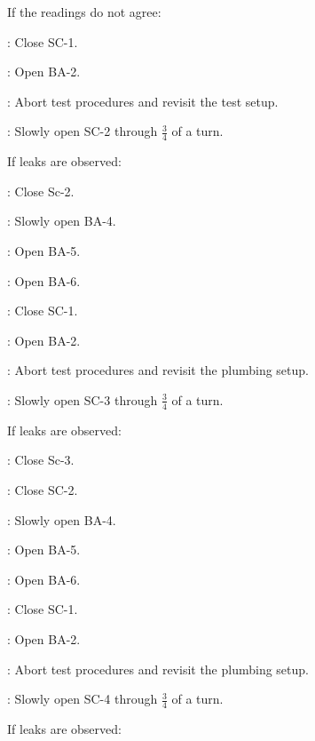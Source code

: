 \begin{checklist}
    \item If the readings do not agree:
    \begin{checklist}
            \item \primary{}: Close SC-1. 
            \item \primary{}: Open BA-2. 
            \item \ops{}: Abort test procedures and revisit the test setup.
    \end{checklist}
    \item \primary{}: Slowly open SC-2 through $\frac{3}{4}$ of a turn.
    \item If leaks are observed:
    \begin{checklist}
            \item \primary{}: Close Sc-2. 
            \item \primary{}: Slowly open BA-4.
            \item \primary{}: Open BA-5. 
            \item \primary{}: Open BA-6. 
            \item \primary{}: Close SC-1.
            \item \primary{}: Open BA-2.
            \item \ops{}: Abort test procedures and revisit the plumbing setup. 
    \end{checklist}
    \item \primary{}: Slowly open SC-3 through $\frac{3}{4}$ of a turn.
    \item If leaks are observed:
    \begin{checklist}
            \item \primary{}: Close Sc-3.
            \item \primary{}: Close SC-2.
            \item \primary{}: Slowly open BA-4.
            \item \primary{}: Open BA-5. 
            \item \primary{}: Open BA-6. 
            \item \primary{}: Close SC-1.
            \item \primary{}: Open BA-2.
            \item \ops{}: Abort test procedures and revisit the plumbing setup. 
    \end{checklist}
    \item \primary{}: Slowly open SC-4 through $\frac{3}{4}$ of a turn.
    \item If leaks are observed:

\end{checklist}
